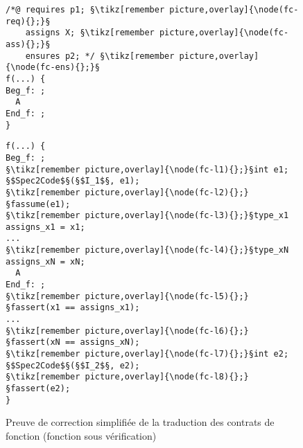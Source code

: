 \begin{figure}[bt]
  \begin{minipage}{0.65\textwidth}
    \begin{lstlisting}[escapechar=§]
/*@ requires p1; §\tikz[remember picture,overlay]{\node(fc-req){};}§
    assigns X; §\tikz[remember picture,overlay]{\node(fc-ass){};}§
    ensures p2; */ §\tikz[remember picture,overlay]{\node(fc-ens){};}§
f(...) {
Beg_f: ;
  A
End_f: ;
}
    \end{lstlisting}
  \end{minipage}\hfill
  \begin{minipage}{0.49\textwidth}
    \begin{lstlisting}[escapechar=§]
f(...) {
Beg_f: ;
§\tikz[remember picture,overlay]{\node(fc-l1){};}§int e1; §$Spec2Code$§(§$I_1$§, e1);
§\tikz[remember picture,overlay]{\node(fc-l2){};}§fassume(e1);
§\tikz[remember picture,overlay]{\node(fc-l3){};}§type_x1 assigns_x1 = x1;
...
§\tikz[remember picture,overlay]{\node(fc-l4){};}§type_xN assigns_xN = xN;
  A
End_f: ;
§\tikz[remember picture,overlay]{\node(fc-l5){};}§fassert(x1 == assigns_x1);
...
§\tikz[remember picture,overlay]{\node(fc-l6){};}§fassert(xN == assigns_xN);
§\tikz[remember picture,overlay]{\node(fc-l7){};}§int e2; §$Spec2Code$§(§$I_2$§, e2);
§\tikz[remember picture,overlay]{\node(fc-l8){};}§fassert(e2);
}
    \end{lstlisting}
  \end{minipage}
  \caption{Preuve de correction simplifiée de la traduction des contrats de
    fonction (fonction sous vérification)}
  \label{fig:proof-fct-contract-main}
\end{figure}
